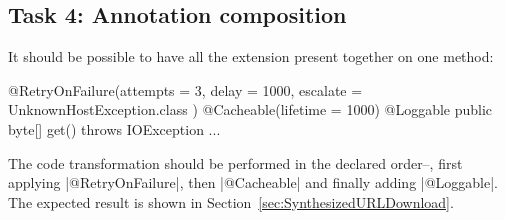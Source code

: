 \subsection{Task 4: Annotation composition}

It should be possible to have all the extension present together on one method:
%
\begin{javacode}
@RetryOnFailure(attempts = 3, delay = 1000, escalate = { UnknownHostException.class })
@Cacheable(lifetime = 1000)
@Loggable
public byte[] get() throws IOException { ... }
\end{javacode}

The code transformation should be performed in the declared order--\Ie, first applying \javainline|@RetryOnFailure|, then \javainline|@Cacheable| and finally adding \javainline|@Loggable|.
The expected result is shown in Section~\ref{sec:SynthesizedURLDownload}.


